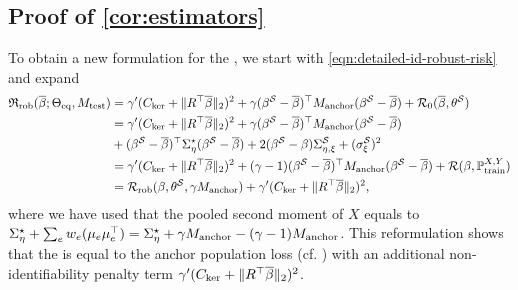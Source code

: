 \subsection{Proof of \cref{cor:estimators}}\label{sec:apx-proof-of-corollary}
To obtain a new formulation for the \idRR, we start with \eqref{eqn:detailed-id-robust-risk} and expand 
\begin{align}
\begin{split}
    \mathfrak{R}_{\mathrm{rob}}(\overline{\beta}; \Theta_{\mathrm{eq}}, M_{\mathrm{test}}) &= \gamma'  (C_{\mathrm{ker}} + \| R^\top \overline{\beta} \|_2)^2 + \gamma (\beta^{\mathcal{S}} - \overline{\beta})^\top M_{\mathrm{anchor}} (\beta^{\mathcal{S}}-\overline{\beta}) + \mathcal{R}_0 (\overline{\beta},\theta^{\mathcal{S}}) \\
    &= \gamma'  (C_{\mathrm{ker}} + \| R^\top \overline{\beta} \|_2)^2 + \gamma (\beta^{\mathcal{S}} - \overline{\beta})^\top M_{\mathrm{anchor}} (\beta^{\mathcal{S}}-\overline{\beta}) \\&+ (\beta^{\mathcal{S}} - \overline{\beta})^\top \Sigma^\star_{\eta} (\beta^{\mathcal{S}}-\overline{\beta}) + 2 (\beta^{\mathcal{S}} - \beta)\Sigma^{\mathcal{S}}_{\eta,\xi} + ({\sigma_\xi^{\mathcal{S}}})^2 \\ &= \gamma'  (C_{\mathrm{ker}} + \| R^\top \overline{\beta} \|_2)^2 + (\gamma - 1)(\beta^{\mathcal{S}} - \overline{\beta})^\top M_{\mathrm{anchor}} (\beta^{\mathcal{S}}-\overline{\beta}) + \mathcal{R}(\beta,\mathbb{P}^{X,Y}_{\mathrm{train}}) \\
    &= \mathcal{R}_{\mathrm{rob}}(\beta, \theta^{\mathcal{S}}, \gamma M_{\mathrm{anchor}}) + \gamma'  (C_{\mathrm{ker}} + \| R^\top \overline{\beta} \|_2)^2,
\end{split}
\end{align}
where we have used that the pooled second moment of $X$ equals to $\Sigma^\star_{\eta} + \sum_e w_e (\mu_e \mu_e^\top) = \Sigma^\star_{\eta} + \gamma M_{\mathrm{anchor}} - (\gamma - 1) M_{\mathrm{anchor}}$.
This reformulation shows that the \idRRs is equal to the anchor population loss (cf. \cite{rothenhausler2021anchor}) with an additional non-identifiability penalty term $\gamma'  (C_{\mathrm{ker}} + \| R^\top \overline{\beta} \|_2)^2$. 

